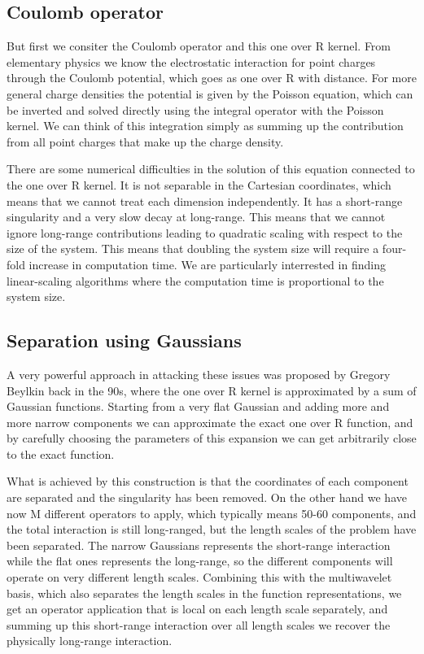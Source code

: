 \documentclass [a4paper]{report}
\begin{document}
\subsection*{Coulomb operator}
But first we consiter the Coulomb operator and this one over R kernel. From elementary physics
we know the electrostatic interaction for point charges through the Coulomb potential, which
goes as one over R with distance. For more general charge densities the potential is given by
the Poisson equation, which can be inverted and solved directly using the integral operator
with the Poisson kernel. We can think of this integration simply as summing up the contribution
from all point charges that make up the charge density.

There are some numerical difficulties in the solution of this equation connected to the one 
over R kernel. It is not separable in the Cartesian coordinates, which means that we cannot
treat each dimension independently. It has a short-range singularity and a very slow decay
at long-range. This means that we cannot ignore long-range contributions leading to quadratic
scaling with respect to the size of the system. This means that doubling the system size will
require a four-fold increase in computation time. We are particularly interrested in finding
linear-scaling algorithms where the computation time is proportional to the system size.

\subsection*{Separation using Gaussians}
A very powerful approach in attacking these issues was proposed by Gregory Beylkin back in 
the 90s, where the one over R kernel is approximated by a sum of Gaussian functions. Starting 
from a very flat Gaussian and adding more and more narrow components we can approximate the 
exact one over R function, and by carefully choosing the parameters of this expansion we can
get arbitrarily close to the exact function.

What is achieved by this construction is that the coordinates of each component are separated
and the singularity has been removed. On the other hand we have now M different operators
to apply, which typically means 50-60 components, and the total interaction is still long-ranged,
but the length scales of the problem have been separated. The narrow Gaussians represents the 
short-range interaction while the flat ones represents the long-range, so the different components
will operate on very different length scales. Combining this with the multiwavelet basis, which
also separates the length scales in the function representations, we get an operator application
that is local on each length scale separately, and summing up this short-range interaction over
all length scales we recover the physically long-range interaction.
\end{document}
